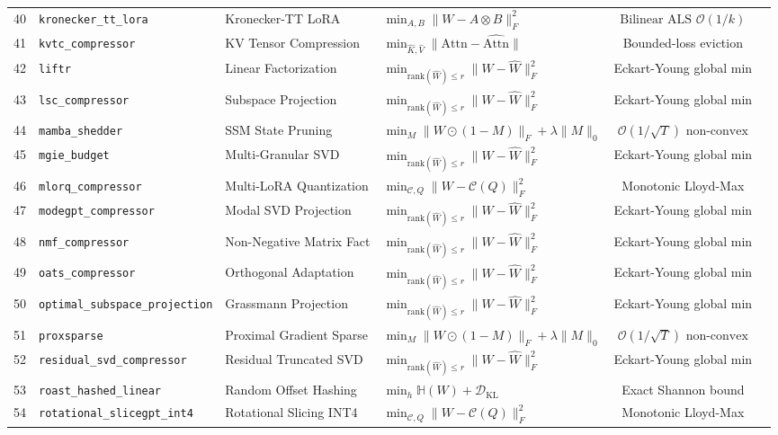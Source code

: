 \begin{center}
\begin{longtable}{rlllcc}
40 & \texttt{kronecker\_tt\_lora} & Kronecker-TT LoRA & $\min_{A, B} \|W - A \otimes B\|_F^2$ & $\text{Bilinear ALS } \mathcal{O}(1/k)$ \\
41 & \texttt{kvtc\_compressor} & KV Tensor Compression & $\min_{\hat{K},\hat{V}} \|\text{Attn} - \hat{\text{Attn}}\|$ & Bounded-loss eviction \\
42 & \texttt{liftr} & Linear Factorization & $\min_{\text{rank}(\hat{W})\le r} \|W - \hat{W}\|_F^2$ & Eckart-Young global min \\
43 & \texttt{lsc\_compressor} & Subspace Projection & $\min_{\text{rank}(\hat{W})\le r} \|W - \hat{W}\|_F^2$ & Eckart-Young global min \\
44 & \texttt{mamba\_shedder} & SSM State Pruning & $\min_M \|W \odot (1-M)\|_F + \lambda \|M\|_0$ & $\mathcal{O}(1/\sqrt{T}) \text{ non-convex}$ \\
45 & \texttt{mgie\_budget} & Multi-Granular SVD & $\min_{\text{rank}(\hat{W})\le r} \|W - \hat{W}\|_F^2$ & Eckart-Young global min \\
46 & \texttt{mlorq\_compressor} & Multi-LoRA Quantization & $\min_{\mathcal{C}, Q} \|W - \mathcal{C}(Q)\|_F^2$ & Monotonic Lloyd-Max \\
47 & \texttt{modegpt\_compressor} & Modal SVD Projection & $\min_{\text{rank}(\hat{W})\le r} \|W - \hat{W}\|_F^2$ & Eckart-Young global min \\
48 & \texttt{nmf\_compressor} & Non-Negative Matrix Fact & $\min_{\text{rank}(\hat{W})\le r} \|W - \hat{W}\|_F^2$ & Eckart-Young global min \\
49 & \texttt{oats\_compressor} & Orthogonal Adaptation & $\min_{\text{rank}(\hat{W})\le r} \|W - \hat{W}\|_F^2$ & Eckart-Young global min \\
50 & \texttt{optimal\_subspace\_projection} & Grassmann Projection & $\min_{\text{rank}(\hat{W})\le r} \|W - \hat{W}\|_F^2$ & Eckart-Young global min \\
51 & \texttt{proxsparse} & Proximal Gradient Sparse & $\min_M \|W \odot (1-M)\|_F + \lambda \|M\|_0$ & $\mathcal{O}(1/\sqrt{T}) \text{ non-convex}$ \\
52 & \texttt{residual\_svd\_compressor} & Residual Truncated SVD & $\min_{\text{rank}(\hat{W})\le r} \|W - \hat{W}\|_F^2$ & Eckart-Young global min \\
53 & \texttt{roast\_hashed\_linear} & Random Offset Hashing & $\min_h \mathbb{H}(W) + \mathcal{D}_{\text{KL}}$ & Exact Shannon bound \\
54 & \texttt{rotational\_slicegpt\_int4} & Rotational Slicing INT4 & $\min_{\mathcal{C}, Q} \|W - \mathcal{C}(Q)\|_F^2$ & Monotonic Lloyd-Max \\

\end{longtable}
\end{center}
